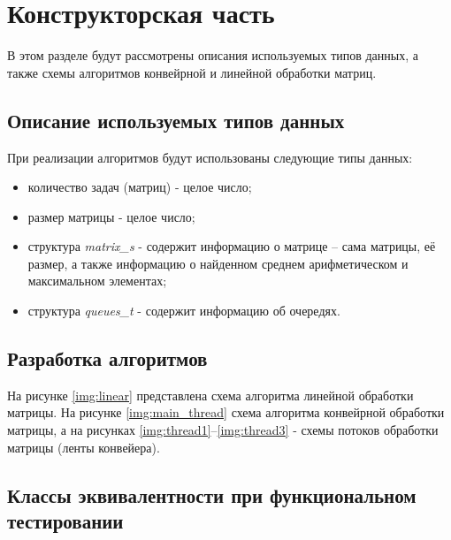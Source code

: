 \chapter{Конструкторская часть}
В этом разделе будут рассмотрены описания используемых типов данных, а также схемы алгоритмов конвейрной и линейной обработки матриц.

\section{Описание используемых типов данных}

При реализации алгоритмов будут использованы следующие типы данных:

\begin{itemize}
	\item количество задач (матриц) - целое число;
	\item размер матрицы - целое число;
	\item структура \textit{matrix\_s} - содержит информацию о матрице -- сама матрицы, её размер, а также информацию о найденном среднем арифметическом и максимальном элементах;
	\item структура \textit{queues\_t} - содержит информацию об очередях.
\end{itemize}

\section{Разработка алгоритмов}
На рисунке \ref{img:linear} представлена схема алгоритма линейной обработки матрицы. На рисунке \ref{img:main_thread} схема алгоритма конвейрной обработки матрицы, а на рисунках \ref{img:thread1}--\ref{img:thread3} - схемы потоков обработки матрицы (ленты конвейера).
\clearpage
{}
\clearpage
{}
\clearpage
{}
\clearpage
{}
\clearpage
{}
\clearpage


\section{Классы эквивалентности при функциональном тестировании}

